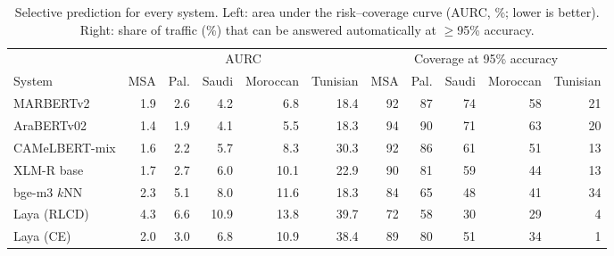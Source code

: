 \begin{table}[t]\centering\small\caption{Selective prediction for every system. Left: area under the risk--coverage curve (AURC, \%; lower is better). Right: share of traffic (\%) that can be answered automatically at $\geq$95\% accuracy.}\label{tab:aurc}
\begin{tabular}{lrrrrrrrrrr}\toprule
& \multicolumn{5}{c}{AURC} & \multicolumn{5}{c}{Coverage at 95\% accuracy}\\
System & MSA & Pal. & Saudi & Moroccan & Tunisian & MSA & Pal. & Saudi & Moroccan & Tunisian \\\midrule
MARBERTv2 & 1.9 & 2.6 & 4.2 & 6.8 & 18.4 & 92 & 87 & 74 & 58 & 21 \\
AraBERTv02 & 1.4 & 1.9 & 4.1 & 5.5 & 18.3 & 94 & 90 & 71 & 63 & 20 \\
CAMeLBERT-mix & 1.6 & 2.2 & 5.7 & 8.3 & 30.3 & 92 & 86 & 61 & 51 & 13 \\
XLM-R base & 1.7 & 2.7 & 6.0 & 10.1 & 22.9 & 90 & 81 & 59 & 44 & 13 \\
bge-m3 $k$NN & 2.3 & 5.1 & 8.0 & 11.6 & 18.3 & 84 & 65 & 48 & 41 & 34 \\
Laya (RLCD) & 4.3 & 6.6 & 10.9 & 13.8 & 39.7 & 72 & 58 & 30 & 29 & 4 \\
Laya (CE) & 2.0 & 3.0 & 6.8 & 10.9 & 38.4 & 89 & 80 & 51 & 34 & 1 \\
\bottomrule\end{tabular}\end{table}
